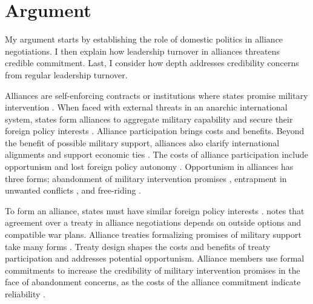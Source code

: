 \documentclass[12pt]{article}
\begin{document}


\section{Argument}


My argument starts by establishing the role of domestic politics in alliance negotiations. 
I then explain how leadership turnover in alliances threatens credible commitment. 
Last, I consider how depth addresses credibility concerns from regular leadership turnover. 


Alliances are self-enforcing contracts or institutions where states promise military intervention \citep{Leedsetal2002, Morrow2000}. 
When faced with external threats in an anarchic international system, states form alliances to aggregate military capability and secure their foreign policy interests \citep{Snyder1997, FordhamPoast2014}.
Alliance participation brings costs and benefits.
Beyond the benefit of possible military support, alliances also clarify international alignments \citep{Snyder1997} and support economic ties \citep{Gowa1995, Long2003, Fordham2010, WolfordKim2017}.  
The costs of alliance participation include opportunism and lost foreign policy autonomy \citep{Altfield1984, Morrow2000, Johnson2015}. 
Opportunism in alliances has three forms; abandonment of military intervention promises \citep{BerkemeierFuhrmann2018}, entrapment in unwanted conflicts \citep{Snyder1984}, and free-riding \citep{Morrow2000}.


To form an alliance, states must have similar foreign policy interests \citep{Morrow1991, Smith1995, FordhamPoast2014}. 
\citet{Poast2019a} notes that agreement over a treaty in alliance negotiations depends on outside options and compatible war plans. 
Alliance treaties formalizing promises of military support take many forms \citep{Leedsetal2002, BensonClinton2016}. 
Treaty design shapes the costs and benefits of treaty participation and addresses potential opportunism.  
Alliance members use formal commitments to increase the credibility of military intervention promises in the face of abandonment concerns, as the costs of the alliance commitment indicate reliability \citep{Morrow2000}.
\end{document}
